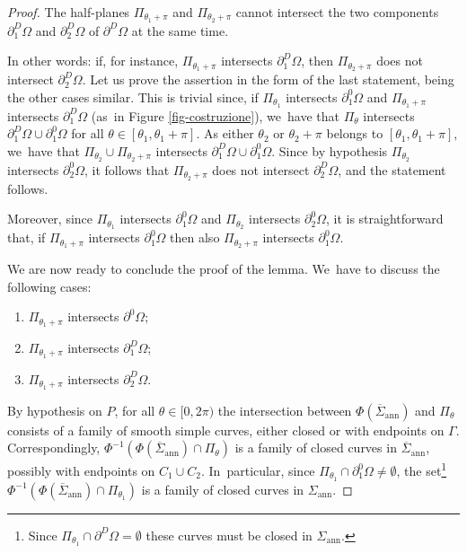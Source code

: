 \documentclass[11pt]{article}
\numberwithin{equation}{section}
\let\Om\Omega
\newcommand{\openannulus}{\Sigma_\mathrm{ann}}
\newcommand{\immclosedann}{\Phi({\overline\Sigma}_\mathrm{ann})}
\theoremstyle{definition}
\begin{document}
\begin{proof}
The half-planes $\Pi_{\theta_1+\pi}$ and $\Pi_{\theta_2+\pi}$ cannot intersect the two components $\partial_1^D\Om$ and $\partial_2^D\Om$ of $\partial^D\Om$ at the same time.

In other words: if, for instance, $\Pi_{\theta_1+\pi}$ intersects $\partial_1^D\Om$, then $\Pi_{\theta_2+\pi}$ does not intersect $\partial_2^D\Om$. Let us prove the assertion in the form of the last statement, being the other
cases similar. This is trivial since, if $\Pi_{\theta_1}$ intersects $\partial_1^0\Om$ and $\Pi_{\theta_1+\pi}$ intersects $\partial_1^D\Om$ (as~in Figure \ref{fig-costruzione}), we~have that $\Pi_{\theta}$ intersects $\partial_1^D\Om\cup\partial_1^0\Om$ for all $\theta\in [\theta_1,\theta_1+\pi]$. As either $\theta_2$ or $\theta_2+\pi$ belongs to $[\theta_1,\theta_1+\pi]$, we~have that $\Pi_{\theta_2}\cup\Pi_{\theta_2+\pi}$ intersects $\partial_1^D\Om\cup\partial_1^0\Om$. Since by hypothesis $\Pi_{\theta_2}$ intersects $\partial_2^0\Om$, it follows that $\Pi_{\theta_2+\pi}$ does not intersect $\partial_2^D\Om$, and the statement follows.

Moreover, since $\Pi_{\theta_1}$ intersects $\partial^0_1\Om$ and $\Pi_{\theta_2}$ intersects $\partial^0_2\Om$, it is straightforward that, if $\Pi_{\theta_1+\pi}$ intersects $\partial_1^0\Om$ then also $\Pi_{\theta_2+\pi}$ intersects $\partial_1^0\Om$.

We are now ready to conclude the proof of the lemma. We~have to discuss the following cases:
\begin{enumerate}[(1),wide]
\item\label{case:new1}
$\Pi_{\theta_1+\pi}$ intersects $\partial^0\Om$;
\item\label{case:new2}
$\Pi_{\theta_1+\pi}$ intersects $\partial_1^D\Om$;
\item\label{case:new3}
$\Pi_{\theta_1+\pi}$ intersects $\partial_2^D\Om$.
\end{enumerate}
By hypothesis on $P$, for all $\theta\in[0,2\pi)$ the intersection between $\immclosedann$ and $\Pi_\theta$ consists of a
family of smooth simple curves, either closed or with endpoints on $\Gamma$. Correspondingly, $\Phi^{-1}(\immclosedann\cap \Pi_\theta)$ is a family of closed curves in
$\overline\Sigma_\mathrm{ann}$, possibly with endpoints on $C_1\cup C_2$.
In~particular, since $\Pi_{\theta_1} \cap \partial^0_1\Om \neq \emptyset$, the set\footnote{Since $\Pi_{\theta_1} \cap \partial^D\Om = \emptyset$ these curves must be closed in $\openannulus$.} $\Phi^{-1}
(\immclosedann\cap \Pi_{\theta_1})$ is a family of closed curves in $\openannulus$.


\end{proof}
\end{document}
